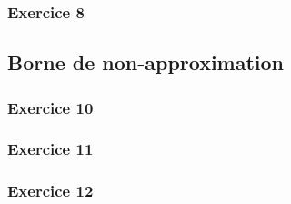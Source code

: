 \subsubsection*{Exercice 8}



%

\subsection{Borne de non-approximation}

\subsubsection*{Exercice 10}


\subsubsection*{Exercice 11}


\subsubsection*{Exercice 12}


\pagebreak